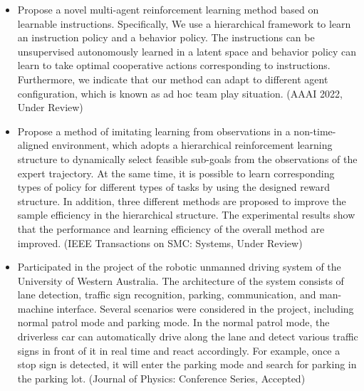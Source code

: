 {\begin{itemize}
    \item Propose a novel multi-agent reinforcement learning method based on learnable instructions. Specifically, We use a hierarchical framework to learn an instruction policy and a behavior policy. The instructions can be unsupervised autonomously learned in a latent
    space and behavior policy can learn to take optimal cooperative actions corresponding to instructions. Furthermore, we
    indicate that our method can adapt to different agent configuration, which is known as ad hoc team play situation.
     (AAAI 2022, Under Review)
    \item Propose a method of imitating learning from observations in a non-time-aligned environment, which adopts a hierarchical reinforcement learning structure to dynamically select feasible sub-goals from the observations of the expert trajectory. At the same time, it is possible to learn corresponding types of policy for different types of tasks by using the designed reward structure. In addition, three different methods are proposed to improve the sample efficiency in the hierarchical structure. The experimental results show that the performance and learning efficiency of the overall method are improved. (IEEE Transactions on SMC: Systems, Under Review)
  \end{itemize}
}

{\small
  \begin{itemize}
    \item Participated in the project of the robotic unmanned driving system of the University of Western Australia. The architecture of the system consists of lane detection, traffic sign recognition, parking, communication, and man-machine interface. Several scenarios were considered in the project, including normal patrol mode and parking mode. In the normal patrol mode, the driverless car can automatically drive along the lane and detect various traffic signs in front of it in real time and react accordingly. For example, once a stop sign is detected, it will enter the parking mode and search for parking in the parking lot. (Journal of Physics: Conference Series, Accepted)
  \end{itemize}
}


